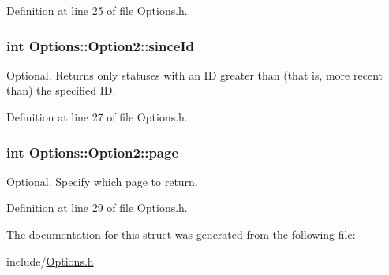 Definition at line 25 of file Options.h.\hypertarget{structOptions_1_1Option2_85cbc83ca0aba0dad6aa4c302e0e09a4}{
\subsubsection{\setlength{\rightskip}{0pt plus 5cm}int {\bf Options::Option2::sinceId}}}
\label{structOptions_1_1Option2_85cbc83ca0aba0dad6aa4c302e0e09a4}


Optional. Returns only statuses with an ID greater than (that is, more recent than) the specified ID. 



Definition at line 27 of file Options.h.\hypertarget{structOptions_1_1Option2_a88bf925f3448deab05709b0c9d6779d}{
\subsubsection{\setlength{\rightskip}{0pt plus 5cm}int {\bf Options::Option2::page}}}
\label{structOptions_1_1Option2_a88bf925f3448deab05709b0c9d6779d}


Optional. Specify which page to return. 



Definition at line 29 of file Options.h.

The documentation for this struct was generated from the following file:\begin{CompactItemize}
\item 
include/\hyperlink{Options_8h}{Options.h}\end{CompactItemize}
